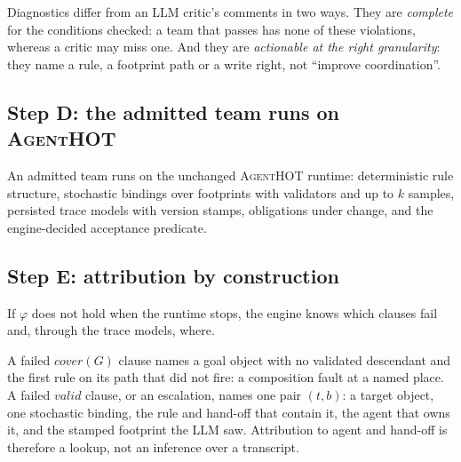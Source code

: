 \documentclass[10pt,a4paper]{article}
\newcommand{\tool}{\textsc{AgentHOT}}
\newcommand{\what}[1]{\par\smallskip\noindent{\sffamily\bfseries\color{accent}#1}\quad}
\begin{document}
Diagnostics differ from an LLM critic's comments in two ways. They are
\emph{complete} for the conditions checked: a team that passes has none of
these violations, whereas a critic may miss one. And they are
\emph{actionable at the right granularity}: they name a rule, a footprint
path or a write right, not ``improve coordination''.

\subsection{Step D: the admitted team runs on \tool{}}

An admitted team runs on the unchanged \tool{} runtime: deterministic rule
structure, stochastic bindings over footprints with validators and up to $k$
samples, persisted trace models with version stamps, obligations under
change, and the engine-decided acceptance predicate.

\subsection{Step E: attribution by construction}\label{sec:attrib}

If $\varphi$ does not hold when the runtime stops, the engine knows which
clauses fail and, through the trace models, where.

\what{Locate.} A failed $\mathit{cover}(G)$ clause names a goal object with
no validated descendant and the first rule on its path that did not fire:
a composition fault at a named place. A failed $\mathit{valid}$ clause, or
an escalation, names one pair $(t,b)$: a target object, one stochastic
binding, the rule and hand-off that contain it, the agent that owns it, and
the stamped footprint the LLM saw. Attribution to agent and hand-off is
therefore a lookup, not an inference over a transcript.
\end{document}
